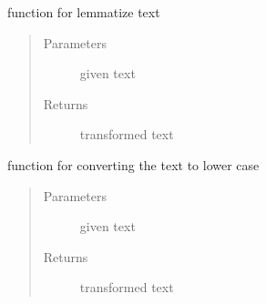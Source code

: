 \documentclass[letterpaper,10pt,english]{sphinxmanual}
\begin{document}
\begin{fulllineitems}
\label{\detokenize{index:data_preprocessing.data_preprocessing.lemmatize_text}}
\sphinxAtStartPar
function for lemmatize text
\begin{quote}\begin{description}
\item[{Parameters}] \leavevmode
\sphinxAtStartPar
{} \textendash{} given text

\item[{Returns}] \leavevmode
\sphinxAtStartPar
transformed text

\end{description}\end{quote}

\end{fulllineitems}


\begin{fulllineitems}
\label{\detokenize{index:data_preprocessing.data_preprocessing.lower_text}}
\sphinxAtStartPar
function for converting the text to lower case
\begin{quote}\begin{description}
\item[{Parameters}] \leavevmode
\sphinxAtStartPar
{} \textendash{} given text

\item[{Returns}] \leavevmode
\sphinxAtStartPar
transformed text

\end{description}\end{quote}

\end{fulllineitems}

\end{document}
